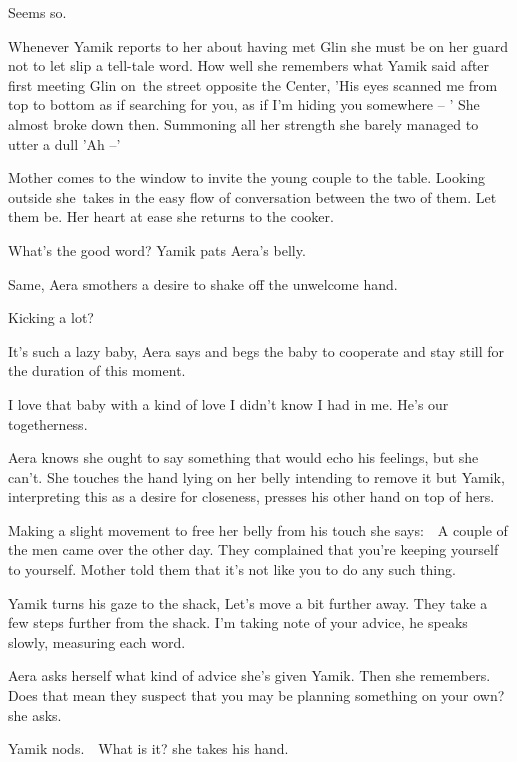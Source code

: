 \documentclass[letterpaper]{article}
\begin{document}
{\textquotedbl}Seems so.{\textquotedbl} 

 Whenever Yamik reports to her about having met Glin she must be on her guard not to let slip a tell-tale word. How well
she remembers what Yamik said after first meeting Glin on~the street opposite the Center, 'His eyes scanned me from top
to bottom as if searching for you, as if I'm hiding you somewhere -- ' She almost broke down then. Summoning all her
strength she barely managed to utter a dull 'Ah --' 

Mother comes to the window to invite the young couple to the table. Looking outside she\textcolor{red}{\ }takes in the
easy flow of conversation between the two of them. Let them be. Her heart at ease she returns to the cooker.

{\textquotedbl}What's the good word?{\textquotedbl} Yamik pats Aera's belly. 

{\textquotedbl}Same,{\textquotedbl} Aera smothers a desire to shake off the unwelcome hand. 

{\textquotedbl}Kicking a lot?{\textquotedbl} 

{\textquotedbl}It's such a lazy baby,{\textquotedbl} Aera says and begs the baby to cooperate and stay still for the
duration of this moment. 

{\textquotedbl}I love that baby with a kind of love I didn't know I had in me. He's our togetherness.{\textquotedbl}

Aera knows she ought to say something that would echo his feelings, but she can't. She touches the hand lying on her
belly intending to remove it but Yamik, interpreting this as a desire for closeness, presses his other hand on top of
hers. 

Making a slight movement to free her belly from his touch she says:\ \ {\textquotedbl}A couple of the men came over the
other day. They complained that you're keeping yourself to yourself. Mother told them that it's not like you to do any
such thing.{\textquotedbl} 

Yamik turns his gaze to the shack, {\textquotedbl}Let's move a bit further away.{\textquotedbl} They take a few steps
further from the shack. {\textquotedbl}I'm taking note of your advice,{\textquotedbl} he speaks slowly, measuring each
word. 

Aera asks herself what kind of advice she{}'s given Yamik. Then she remembers. {\textquotedbl}Does that mean they
suspect that you may be planning something on your own?{\textquotedbl} she asks.

Yamik nods.\ \ {\textquotedbl}What is it?{\textquotedbl} she takes his hand. 
\end{document}
